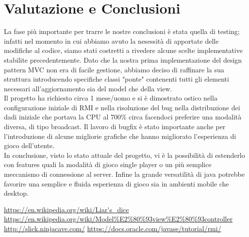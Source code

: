 \documentclass{llncs}
\begin{document}


	
	\section{Valutazione e Conclusioni}%
		La fase più importante per trarre le nostre conclusioni è stata quella di testing; infatti nel momento in cui abbiamo avuto la nesessità di apportate delle modifiche al codice, siamo stati costretti a rivedere alcune scelte implementative stabilite precedentemente. Dato che la nostra prima implementazione del design pattern MVC non era di facile gestione, abbiamo deciso di raffinare la sua struttura introducendo specifiche classi "ponte" contenenti tutti gli elementi necessari all'aggiornamento sia del model che della view. \\
		Il progetto ha richiesto circa 1 mese/uomo e si è dimostrato ostico nella configurazione iniziale di RMI e nella risoluzione del bug nella distribuzione dei dadi iniziale che portava la CPU al 700\% circa facendoci preferire una modalità diversa, di tipo broadcast.
		Il lavoro di bugfix è stato importante anche per l'introduzione di alcune migliorie grafiche che hanno migliorato l'esperienza di gioco dell'utente. \\
		In conclusione, visto lo stato attuale del progetto, vi è la possibilità di estenderlo con features quali la modalità di gioco single player o un più semplice meccanismo di connessione al server. Infine la grande versatilità di java potrebbe favorire una semplice e fluida esperienza di gioco sia in ambienti mobile che desktop.
	

	\begin{thebibliography}{}
		 \url{https://en.wikipedia.org/wiki/Liar's\_dice}
		 \url{https://en.wikipedia.org/wiki/Model%E2%80%93view%E2%80%93controller}
		 \url{http://slick.ninjacave.com/}
		 \url{https://docs.oracle.com/javase/tutorial/rmi/}
	\end{thebibliography}
\end{document}
